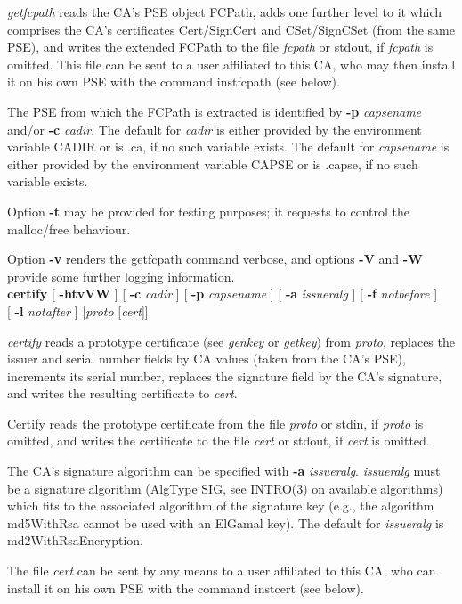{\em getfcpath} reads the CA's PSE object FCPath, adds one further level
to it which comprises the CA's certificates Cert/SignCert and CSet/SignCSet (from the same PSE), and writes the 
extended FCPath
to the file {\em fcpath} or stdout, if {\em fcpath} is omitted. This file can be sent to a user 
affiliated to this
CA, who may then install it on his own PSE with the command instfcpath (see below). 
 
The PSE from which the FCPath is extracted is identified by {\bf -p} {\em capsename} and/or
{\bf -c} {\em cadir}. 
The default for {\em cadir} is either provided by the environment variable
CADIR or is .ca, if no such variable exists.
The default for {\em capsename} is either provided by the environment variable
CAPSE or is .capse, if no such variable exists.
 
Option {\bf -t} may be provided for testing purposes; it requests to control the malloc/free behaviour.

Option {\bf -v} renders the getfcpath command verbose, and options {\bf -V} and {\bf -W} 
provide some further logging information.
\\ [1em]
{\bf certify} [ {\bf -htvVW} ] [ {\bf -c} {\em cadir} ] [ {\bf -p} {\em capsename} ] [ {\bf -a} {\em issueralg} ] [ {\bf -f} {\em notbefore} ] \\
\hspace*{2cm} [ {\bf -l} {\em notafter} ] [{\em proto} [{\em cert}]]

{\em certify} reads a prototype certificate (see {\em genkey} or {\em getkey}) from {\em proto},
replaces the issuer and serial number fields by CA values (taken from the CA's PSE), increments its 
serial number,
replaces the signature field by the CA's signature, and writes the resulting
certificate to {\em cert}. 

Certify reads the prototype certificate
from the file {\em proto} or stdin, if {\em proto} is omitted, and writes the certificate
to the file {\em cert} or stdout, if {\em cert} is omitted. 

The CA's signature 
algorithm can be specified with {\bf -a} {\em issueralg}. {\em issueralg} must be a
signature algorithm (AlgType SIG, see INTRO(3) on available algorithms) which fits to the associated 
algorithm of the signature key (e.g., the algorithm md5WithRsa cannot be used with an ElGamal key).
The default for {\em issueralg} is md2WithRsaEncryption. 

The file {\em cert} can be sent by any means to a user affiliated to this
CA, who can install it on his own PSE with the command instcert (see below). 
 
